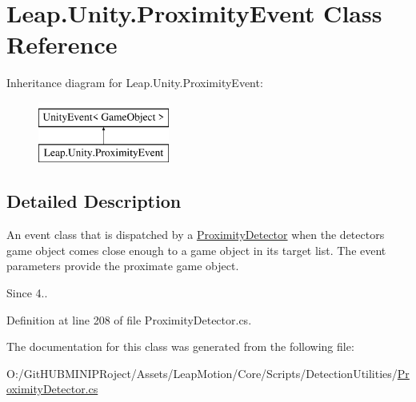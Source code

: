 \hypertarget{class_leap_1_1_unity_1_1_proximity_event}{}\section{Leap.\+Unity.\+Proximity\+Event Class Reference}
\label{class_leap_1_1_unity_1_1_proximity_event}
Inheritance diagram for Leap.\+Unity.\+Proximity\+Event\+:\begin{figure}[H]
\begin{center}
\leavevmode
\includegraphics[height=2.000000cm]{class_leap_1_1_unity_1_1_proximity_event}
\end{center}
\end{figure}


\subsection{Detailed Description}
An event class that is dispatched by a \mbox{\hyperlink{class_leap_1_1_unity_1_1_proximity_detector}{Proximity\+Detector}} when the detector\textquotesingle{}s game object comes close enough to a game object in its target list. The event parameters provide the proximate game object. \begin{DoxySince}{Since}
4.. 
\end{DoxySince}


Definition at line 208 of file Proximity\+Detector.\+cs.



The documentation for this class was generated from the following file\+:\begin{DoxyCompactItemize}
\item 
O\+:/\+Git\+H\+U\+B\+M\+I\+N\+I\+P\+Roject/\+Assets/\+Leap\+Motion/\+Core/\+Scripts/\+Detection\+Utilities/\mbox{\hyperlink{_proximity_detector_8cs}{Proximity\+Detector.\+cs}}\end{DoxyCompactItemize}
